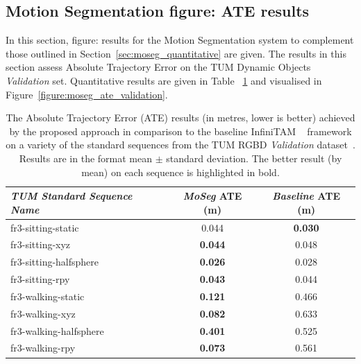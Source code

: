 \subsection{Motion Segmentation figure: ATE results}
In this section, figure: results for the Motion Segmentation system
to complement those outlined in Section~\ref{sec:moseg_quantitative} are given.
The results in this section assess Absolute Trajectory Error on the TUM Dynamic
Objects \textit{Validation} set. Quantitative results are given in Table
~\ref{table:moseg_ate_validation} and visualised in Figure~\ref{figure:moseg_ate_validation}.

\begin{table}[!htbp]
\begin{center}
  \begin{tabular}{l c c}
    \emph{TUM Standard Sequence Name} & \emph{MoSeg} ATE (m) & \emph{Baseline} ATE (m) \\
    \midrule
    \textsf{fr3-sitting-static} & 0.044 & \textbf{0.030}\\
    \textsf{fr3-sitting-xyz} & \textbf{0.044} & 0.048 \\
    \textsf{fr3-sitting-halfsphere} & \textbf{0.026} & 0.028\\
    \textsf{fr3-sitting-rpy} & \textbf{0.043} & 0.044\\
    \textsf{fr3-walking-static} & \textbf{0.121} & 0.466\\
    \textsf{fr3-walking-xyz} & \textbf{0.082} & 0.633\\
    \textsf{fr3-walking-halfsphere} & \textbf{0.401} & 0.525\\
    \textsf{fr3-walking-rpy} & \textbf{0.073} & 0.561\\
  \end{tabular}
\end{center}
\caption[Motion Segmentation ATE Validation Set]
{The Absolute Trajectory Error (ATE) results (in metres, lower is better) 
achieved by the proposed approach in comparison to the baseline InfiniTAM
~\cite{Prisacariu2014} framework on a variety of the standard sequences from
  the TUM RGBD \textit{Validation} dataset~\cite{Sturm2012}. Results are in the
  format mean \( \pm \) standard deviation. The better result (by mean) on each
  sequence is highlighted in bold.}
~\label{table:moseg_ate_validation}
\end{table}

